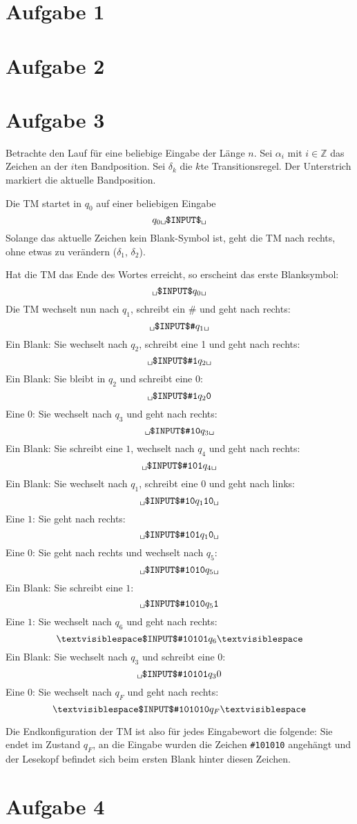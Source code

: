 \documentclass[a4paper]{article}
\newcommand{\tvs}{\textvisiblespace}
\begin{document}
\section{Aufgabe 1}

\section{Aufgabe 2}

\section{Aufgabe 3}

Betrachte den Lauf für eine beliebige Eingabe der Länge $n$.
Sei $\alpha_i$ mit $i \in \mathbb{Z}$ das Zeichen an der $i$ten Bandposition.
Sei $\delta_k$ die $k$te Transitionsregel.
Der Unterstrich markiert die aktuelle Bandposition.


Die TM startet in $q_0$ auf einer beliebigen Eingabe
\[ \texttt{$q_0$\tvs\$INPUT\$\tvs} \]
Solange das aktuelle Zeichen kein Blank-Symbol ist,
geht die TM nach rechts, ohne etwas zu verändern ($\delta_1$, $\delta_2$).

Hat die TM das Ende des Wortes erreicht, so erscheint das erste Blanksymbol:
\[ \texttt{\tvs\$INPUT\$$q_0$\tvs} \]
Die TM wechselt nun nach $q_1$, schreibt ein \# und geht nach rechts:
\[ \texttt{\tvs\$INPUT\$\#$q_1$\tvs} \]
Ein Blank: Sie wechselt nach $q_2$, schreibt eine 1 und geht nach rechts:
\[ \texttt{\tvs\$INPUT\$\#1$q_2$\tvs} \]
Ein Blank: Sie bleibt in $q_2$ und schreibt eine $0$:
\[ \texttt{\tvs\$INPUT\$\#1$q_2$0} \]
Eine $0$: Sie wechselt nach $q_3$ und geht nach rechts:
\[ \texttt{\tvs\$INPUT\$\#10$q_3$\tvs} \]
Ein Blank: Sie schreibt eine $1$, wechselt nach $q_4$ und geht nach rechts:
\[ \texttt{\tvs\$INPUT\$\#101$q_4$\tvs} \]
Ein Blank: Sie wechselt nach $q_1$, schreibt eine $0$ und geht nach links:
\[ \texttt{\tvs\$INPUT\$\#10$q_1$10\tvs} \]
Eine $1$: Sie geht nach rechts:
\[ \texttt{\tvs\$INPUT\$\#101$q_1$0\tvs} \]
Eine $0$: Sie geht nach rechts und wechselt nach $q_5$:
\[ \texttt{\tvs\$INPUT\$\#1010$q_5$\tvs} \]
Ein Blank: Sie schreibt eine $1$:
\[ \texttt{\tvs\$INPUT\$\#1010$q_5$1} \]
Eine $1$: Sie wechselt nach $q_6$ und geht nach rechts:
\[ \texttt{\tvs\$INPUT\$\#10101$q_6$}\tvs \]
Ein Blank: Sie wechselt nach $q_3$ und schreibt eine $0$:
\[ \texttt{\tvs\$INPUT\$\#10101$q_3$}0 \]
Eine $0$: Sie wechselt nach $q_F$ und geht nach rechts:
\[ \texttt{\tvs\$INPUT\$\#101010$q_F$}\tvs \]

Die Endkonfiguration der TM ist also für jedes Eingabewort die folgende:
Sie endet im Zustand $q_F$, an die Eingabe wurden die Zeichen
\texttt{\#101010} angehängt und der Lesekopf befindet sich beim ersten Blank
hinter diesen Zeichen.

\section{Aufgabe 4}
\end{document}
